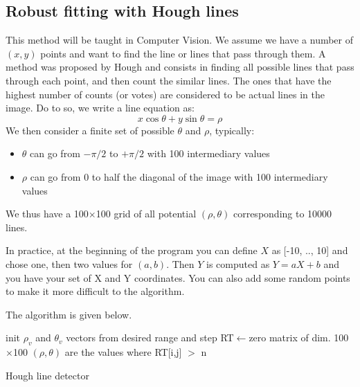 \documentclass{ecnreport}
\begin{document}
\begin{itemize}
 \end{itemize}
 
 \subsection{Robust fitting with Hough lines}
 
 This method will be taught in Computer Vision. We assume we have a number of $(x,y)$ points and want to find the line or lines that pass through them.
 A method was proposed by Hough and consists in finding all possible lines that pass through each point, and then count the similar lines. The ones that have
 the highest number of counts (or votes) are considered to be actual lines in the image.
 Do to so, we write a line equation as:
 \begin{equation*}
  x\cos\theta + y\sin\theta = \rho
 \end{equation*}We then consider a finite set of possible $\theta$ and $\rho$, typically:
 \begin{itemize}
  \item $\theta$ can go from $-\pi/2$ to $+\pi/2$ with 100 intermediary values
  \item $\rho$ can go from 0 to half the diagonal of the image with 100 intermediary values
 \end{itemize}
 We thus have a 100$\times$100 grid of all potential $(\rho,\theta)$ corresponding to 10000 lines.
 
 In practice, at the beginning of the program you can define $X$ as [-10, .., 10] and chose one, then two values for $(a,b)$.
 Then $Y$ is computed as $Y=aX+b$ and you have your set of X and Y coordinates. You can also add some random points to make it more difficult to the algorithm.
 
 The algorithm is given below.

 
\begin{algorithm}[!h]
{}
init $\rho_v$ and $\theta_v$ vectors from desired range and step\;
RT$\gets$zero matrix of dim. 100$\times$100\;
$(\rho,\theta)$ are the values where RT[i,j] $>$ n\;
\caption{Hough line detector}
\label{algo:hough}
\end{algorithm}
\end{document}
